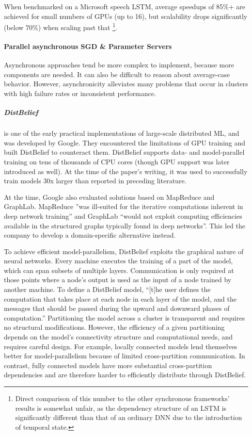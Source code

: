 When benchmarked on a Microsoft speech LSTM, average speedups of 85\%+ are achieved for small numbers of GPUs (up to 16), but scalability drops significantly (below 70\%) when scaling past that \footnote{Direct comparison of this number to the other synchronous frameworks' results is somewhat unfair, as the dependency structure of an LSTM is significantly different than that of an ordinary DNN due to the introduction of temporal state.}.


\paragraph{Parallel asynchronous SGD \& Parameter Servers}

Asynchronous approaches tend be more complex to implement, because more components are needed. It can also be difficult to reason about average-case behavior. However, asynchronicity alleviates many problems that occur in clusters with high failure rates or inconsistent performance.

\subparagraph{DistBelief \citep{DistBelief2012}}
is one of the early practical implementations of large-scale distributed ML, and was developed by Google. They encountered the limitations of GPU training and built DistBelief to counteract them. DistBelief supports data- and model-parallel training on tens of thousands of CPU cores (though GPU support was later introduced as well\citep{Tensorflow2016}). At the time of the paper's writing, it was used to successfully train models 30x larger than reported in preceding literature.

At the time, Google also evaluated solutions based on MapReduce\citep{MapReduce} and GraphLab\citep{GraphLab}. MapReduce ”was ill-suited for the iterative computations inherent in deep network training” and GraphLab “would not exploit computing efficiencies available in the structured graphs typically found in deep networks”. This led the company to develop a domain-specific alternative instead.

To achieve efficient model-parallelism, DistBelief exploits the graphical nature of neural networks. Every machine executes the training of a part of the model, which can span subsets of multiple layers. Communication is only required at those points where a node’s output is used as the input of a node trained by another machine. To define a DistBelief model, “[t]he user defines the computation that takes place at each node in each layer of the model, and the messages that should be passed during the upward and downward phases of computation.” Partitioning the model across a cluster is transparent and requires no structural modifications. However, the efficiency of a given partitioning depends on the model’s connectivity structure and computational needs, and requires careful design. For example, locally connected models lend themselves better for model-parallelism because of limited cross-partition communication. In contrast, fully connected models have more substantial cross-partition dependencies and are therefore harder to efficiently distribute through DistBelief.

